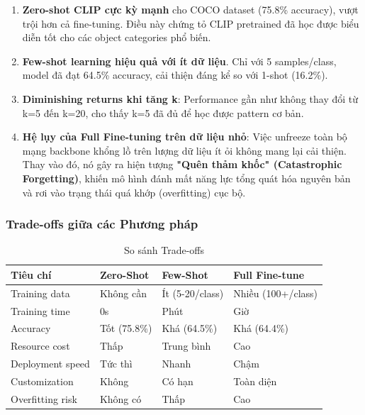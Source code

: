 \begin{enumerate}
    \item \textbf{Zero-shot CLIP cực kỳ mạnh} cho COCO dataset (75.8\% accuracy), vượt trội hơn cả fine-tuning. Điều này chứng tỏ CLIP pretrained đã học được biểu diễn tốt cho các object categories phổ biến.

    \item \textbf{Few-shot learning hiệu quả với ít dữ liệu}. Chỉ với 5 samples/class, model đã đạt 64.5\% accuracy, cải thiện đáng kể so với 1-shot (16.2\%).

    \item \textbf{Diminishing returns khi tăng k}: Performance gần như không thay đổi từ k=5 đến k=20, cho thấy k=5 đã đủ để học được pattern cơ bản.

    \item \textbf{Hệ lụy của Full Fine-tuning trên dữ liệu nhỏ}: Việc unfreeze toàn bộ mạng backbone khổng lồ trên lượng dữ liệu ít ỏi không mang lại cải thiện. Thay vào đó, nó gây ra hiện tượng \textbf{"Quên thảm khốc" (Catastrophic Forgetting)}, khiến mô hình đánh mất năng lực tổng quát hóa nguyên bản và rơi vào trạng thái quá khớp (overfitting) cục bộ.
\end{enumerate}

\subsubsection{Trade-offs giữa các Phương pháp}

\begin{table}[H]
    \centering
    \caption{So sánh Trade-offs}
    \begin{tabular}{|l|l|l|l|}
        \hline
        \textbf{Tiêu chí} & \textbf{Zero-Shot} & \textbf{Few-Shot} & \textbf{Full Fine-tune} \\
        \hline
        Training data & Không cần & Ít (5-20/class) & Nhiều (100+/class) \\
        \hline
        Training time & 0s & Phút & Giờ \\
        \hline
        Accuracy & Tốt (75.8\%) & Khá (64.5\%) & Khá (64.4\%) \\
        \hline
        Resource cost & Thấp & Trung bình & Cao \\
        \hline
        Deployment speed & Tức thì & Nhanh & Chậm \\
        \hline
        Customization & Không & Có hạn & Toàn diện \\
        \hline
        Overfitting risk & Không có & Thấp & Cao \\
        \hline
    \end{tabular}
    \label{tab:tradeoffs}
\end{table}

